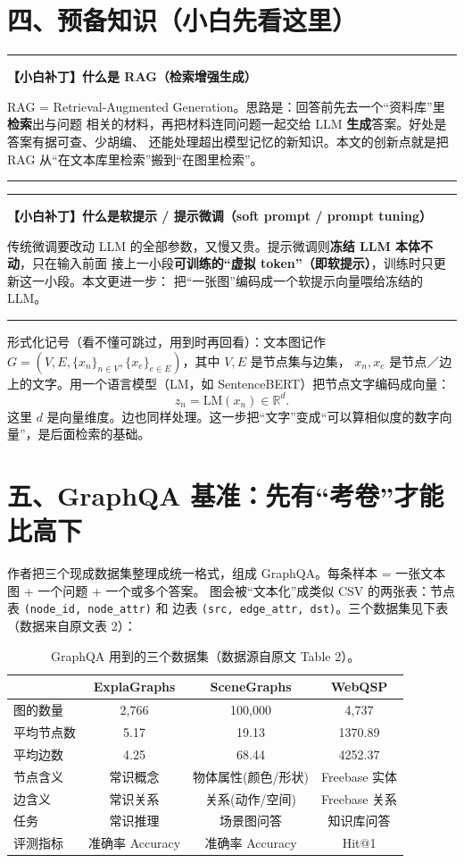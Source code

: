 \documentclass[11pt,UTF8,fontset=fandol]{ctexart}
\newenvironment{tip}[1]{%
  \par\smallskip\noindent\rule{\linewidth}{0.4pt}\par\nobreak
  \noindent\textbf{【小白补丁】#1}\par\nobreak\noindent\ignorespaces
}{%
  \par\noindent\rule{\linewidth}{0.4pt}\par\smallskip
}
\begin{document}
\section{四、预备知识（小白先看这里）}

\begin{tip}{什么是 RAG（检索增强生成）}
RAG = Retrieval-Augmented Generation。思路是：回答前先去一个“资料库”里\textbf{检索}出与问题
相关的材料，再把材料连同问题一起交给 LLM \textbf{生成}答案。好处是答案有据可查、少胡编、
还能处理超出模型记忆的新知识。本文的创新点就是把 RAG 从“在文本库里检索”搬到“在图里检索”。
\end{tip}

\begin{tip}{什么是软提示 / 提示微调（soft prompt / prompt tuning）}
传统微调要改动 LLM 的全部参数，又慢又贵。提示微调则\textbf{冻结 LLM 本体不动}，只在输入前面
接上一小段\textbf{可训练的“虚拟 token”（即软提示）}，训练时只更新这一小段。本文更进一步：
把“一张图”编码成一个软提示向量喂给冻结的 LLM。
\end{tip}

形式化记号（看不懂可跳过，用到时再回看）：文本图记作
$G=(V,E,\{x_n\}_{n\in V},\{x_e\}_{e\in E})$，其中 $V,E$ 是节点集与边集，
$x_n,x_e$ 是节点／边上的文字。用一个语言模型（LM，如 SentenceBERT）把节点文字编码成向量：
\begin{equation*}
  z_n = \mathrm{LM}(x_n)\in\mathbb{R}^{d}. \tag{1}
\end{equation*}
这里 $d$ 是向量维度。边也同样处理。这一步把“文字”变成“可以算相似度的数字向量”，是后面检索的基础。

\section{五、GraphQA 基准：先有“考卷”才能比高下}

作者把三个现成数据集整理成统一格式，组成 GraphQA。每条样本 = 一张文本图 + 一个问题 + 一个或多个答案。
图会被“文本化”成类似 CSV 的两张表：节点表 \texttt{(node\_id, node\_attr)} 和
边表 \texttt{(src, edge\_attr, dst)}。三个数据集见下表（数据来自原文表 2）：

\begin{table}[H]\centering
\caption{GraphQA 用到的三个数据集（数据源自原文 Table 2）。}
\begin{tabular}{lccc}
\toprule
 & \textbf{ExplaGraphs} & \textbf{SceneGraphs} & \textbf{WebQSP} \\
\midrule
图的数量 & 2{,}766 & 100{,}000 & 4{,}737 \\
平均节点数 & 5.17 & 19.13 & 1370.89 \\
平均边数 & 4.25 & 68.44 & 4252.37 \\
节点含义 & 常识概念 & 物体属性(颜色/形状) & Freebase 实体 \\
边含义 & 常识关系 & 关系(动作/空间) & Freebase 关系 \\
任务 & 常识推理 & 场景图问答 & 知识库问答 \\
评测指标 & 准确率 Accuracy & 准确率 Accuracy & Hit@1 \\
\bottomrule
\end{tabular}
\end{table}
\end{document}
